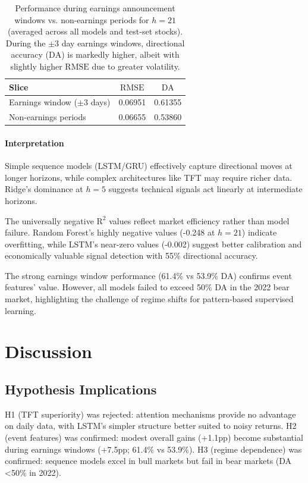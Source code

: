 \documentclass[conference,a4paper]{IEEEtran}
\newcommand{\rmse}{\ensuremath{\mathrm{RMSE}}}
\newcommand{\rTwo}{\ensuremath{\mathrm{R}^2}}
\newcommand{\da}{\ensuremath{\mathrm{DA}}}
\begin{document}
\begin{table}[t]
    \centering
    \caption{Performance during earnings announcement windows vs. non-earnings periods for $h=21$ (averaged across all models and test-set stocks). During the $\pm3$ day earnings windows, directional accuracy (\da{}) is markedly higher, albeit with slightly higher \rmse{} due to greater volatility.}
    \label{tab:earnings}
    \begin{tabular}{lcc}
        \toprule
        Slice & $\rmse$ & $\da$ \\
        \midrule
        Earnings window ($\pm3$ days) & 0.06951 & 0.61355 \\
        Non-earnings periods         & 0.06655 & 0.53860 \\
        \bottomrule
    \end{tabular}
\end{table}

\paragraph{Interpretation} Simple sequence models (LSTM/GRU) effectively capture directional moves at longer horizons, while complex architectures like TFT may require richer data. Ridge's dominance at $h=5$ suggests technical signals act linearly at intermediate horizons.

The universally negative $\rTwo$ values reflect market efficiency rather than model failure. Random Forest's highly negative values (-0.248 at $h=21$) indicate overfitting, while LSTM's near-zero values (-0.002) suggest better calibration and economically valuable signal detection with 55\% directional accuracy.

The strong earnings window performance (61.4\% vs 53.9\% DA) confirms event features' value. However, all models failed to exceed 50\% DA in the 2022 bear market, highlighting the challenge of regime shifts for pattern-based supervised learning.

\section{Discussion}

\subsection{Hypothesis Implications}

H1 (TFT superiority) was rejected: attention mechanisms provide no advantage on daily data, with LSTM's simpler structure better suited to noisy returns. H2 (event features) was confirmed: modest overall gains (+1.1pp) become substantial during earnings windows (+7.5pp; 61.4\% vs 53.9\%). H3 (regime dependence) was confirmed: sequence models excel in bull markets but fail in bear markets (DA <50\% in 2022).
\end{document}
